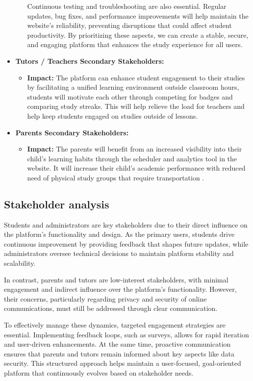 \begin{itemize}
\begin{itemize}
        Continuous testing and troubleshooting are also essential. Regular updates, bug fixes, and performance improvements will help maintain the website’s reliability, preventing disruptions that could affect student productivity. By prioritizing these aspects, we can create a stable, secure, and engaging platform that enhances the study experience for all users.
    \end{itemize}

    \item \textbf{Tutors / Teachers {Secondary Stakeholders}:}
    \begin{itemize}
        \item \textbf{Impact:} The platform can enhance student engagement to their studies by facilitating a unified learning environment outside classroom hours, students will motivate each other through competing for badges and comparing study streaks. This will help relieve the load for teachers and help keep students engaged on studies outside of lessons.
    \end{itemize}

    \item \textbf{Parents {Secondary Stakeholders}:}
    \begin{itemize}
        \item \textbf{Impact:} The parents will benefit from an increased visibility into their child's learning habits through the scheduler and analytics tool in the website. It will increase their child's academic performance with reduced need of physical study groups that require transportation .
    \end{itemize}
\end{itemize}

\subsection{Stakeholder analysis}
Students and administrators are key stakeholders due to their direct influence on the platform’s functionality and design. As the primary users, students drive continuous improvement by providing feedback that shapes future updates, while administrators oversee technical decisions to maintain platform stability and scalability.

In contrast, parents and tutors are low-interest stakeholders, with minimal engagement and indirect influence over the platform’s functionality. However, their concerns, particularly regarding privacy and security of online communications, must still be addressed through clear communication.

To effectively manage these dynamics, targeted engagement strategies are essential. Implementing feedback loops, such as surveys, allows for rapid iteration and user-driven enhancements. At the same time, proactive communication ensures that parents and tutors remain informed about key aspects like data security. This structured approach helps maintain a user-focused, goal-oriented platform that continuously evolves based on stakeholder needs.
